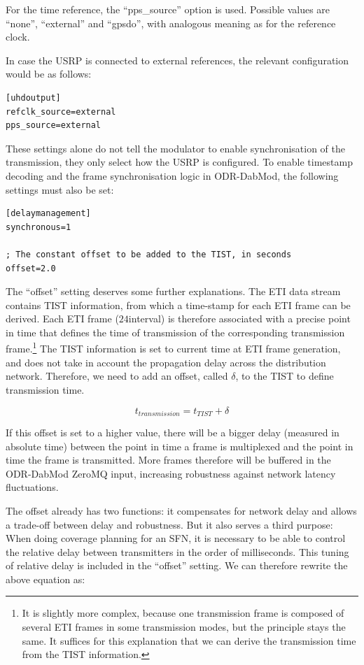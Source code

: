 For the time reference, the ``pps\_source'' option is used. Possible values are
``none'', ``external'' and ``gpsdo'', with analogous meaning as for the
reference clock.

In case the USRP is connected to external references, the relevant configuration
would be as follows:

\begin{lstlisting}
[uhdoutput]
refclk_source=external
pps_source=external
\end{lstlisting}

These settings alone do not tell the modulator to enable synchronisation of the
transmission, they only select how the USRP is configured. To enable timestamp
decoding and the frame synchronisation logic in ODR-DabMod, the following
settings must also be set:

\begin{lstlisting}
[delaymanagement]
synchronous=1

; The constant offset to be added to the TIST, in seconds
offset=2.0
\end{lstlisting}

The ``offset'' setting deserves some further explanations. The ETI data stream
contains TIST information, from which a time-stamp for each ETI frame can be
derived. Each ETI frame ($24$\ms interval) is therefore associated with a
precise point in time that defines the time of transmission of the corresponding
transmission frame.\footnote{It is slightly more complex, because one
    transmission frame is composed of several ETI frames in some
    transmission modes, but the principle stays the same. It suffices for this
    explanation that we can derive the transmission time from the TIST
information.} The TIST information is set to current time at ETI frame
generation, and does not take in account the propagation delay across the
distribution network. Therefore, we need to add an offset, called $\delta$, to
the TIST to define transmission time.

\[
t_{transmission} = t_{TIST} + \delta
\]

If this offset is set to a higher value, there will be a bigger delay (measured
in absolute time) between the point in time a frame is multiplexed and the point
in time the frame is transmitted. More frames therefore will be buffered in
the ODR-DabMod ZeroMQ input, increasing robustness against network latency
fluctuations.

The offset already has two functions: it compensates for network delay and
allows a trade-off between delay and robustness. But it also serves a third
purpose: When doing coverage planning for an SFN, it is necessary to be able to
control the relative delay between transmitters in the order of milliseconds.
This tuning of relative delay is included in the ``offset'' setting. We can
therefore rewrite the above equation as:

